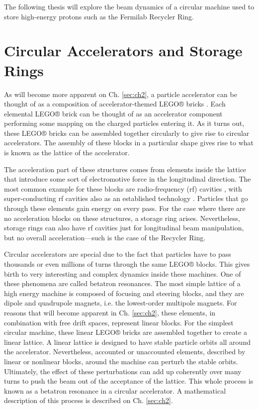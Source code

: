 The following thesis will explore the beam dynamics of a circular machine used to store high-energy protons such as the Fermilab Recycler Ring.         

\section{Circular Accelerators and Storage Rings}

As will become more apparent on Ch. \ref{sec:ch2}, a particle accelerator can be thought of as a composition of accelerator-themed LEGO® bricks \cite{forest}. Each elemental LEGO® brick can be thought of as an accelerator component performing some mapping on the charged particles entering it. As it turns out, these LEGO® bricks can be assembled together circularly to give rise to circular accelerators. The assembly of these blocks in a particular shape gives rise to what is known as the lattice of the accelerator.

The acceleration part of these structures comes from elements inside the lattice that introduce some sort of electromotive force in the longitudinal direction. The most common example for these blocks are radio-frequency (rf) cavities \cite{sylee}, with super-conducting rf cavities also as an established technology \cite{srfcavs}. Particles that go through these elements gain energy on every pass. For the case where there are no acceleration blocks on these structures, a storage ring arises. Nevertheless, storage rings can also have rf cavities just for longitudinal beam manipulation, but no overall acceleration---such is the case of the Recycler Ring.    

Circular accelerators are special due to the fact that particles have to pass thousands or even millions of turns through the same LEGO® blocks. This gives birth to very interesting and complex dynamics inside these machines. One of these phenomena are called betatron resonances. The most simple lattice of a high energy machine is composed of focusing and steering blocks, and they are dipole and quadrupole magnets, i.e. the lowest-order multipole magnets. For reasons that will become apparent in Ch. \ref{sec:ch2}, these elements, in combination with free drift spaces, represent linear blocks. For the simplest circular machine, these linear LEGO® bricks are assembled together to create a linear lattice. A linear lattice is designed to have stable particle orbits all around the accelerator. Nevertheless, accounted or unaccounted elements, described by linear or nonlinear blocks, around the machine can perturb the stable orbits. Ultimately, the effect of these perturbations can add up coherently over many turns to push the beam out of the acceptance of the lattice. This whole process is known as a betatron resonance in a circular accelerator. A mathematical description of this process is described on Ch. \ref{sec:ch2}.

